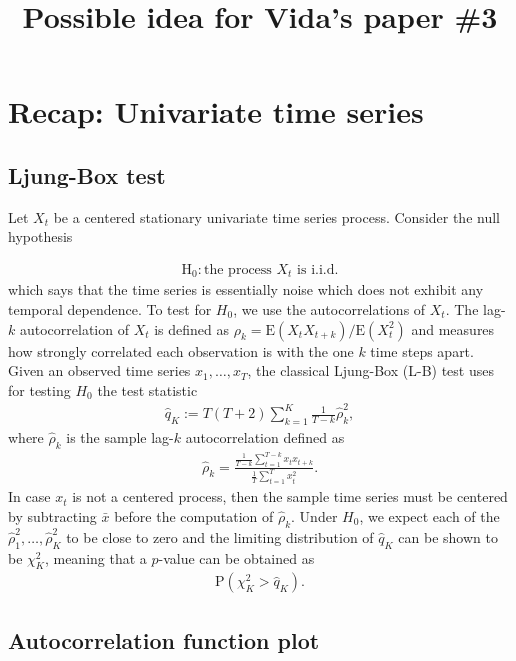 \documentclass{article}
\title{Possible idea for Vida's paper \#3}
\date{}
\begin{document}
\maketitle

\section{Recap: Univariate time series}

\subsection{Ljung-Box test}

Let $X_t$ be a centered stationary univariate time series process. Consider the null hypothesis

\begin{align*}
    \mathrm{H_{0}}: \mbox{the process $X_t$ is i.i.d.} 
\end{align*}
which says that the time series is essentially noise which does not exhibit any temporal dependence. To test for $H_{0}$, we use the autocorrelations of $X_t$. The lag-$k$ autocorrelation of $X_t$ is defined as $\rho_k = \mathrm{E}(X_t X_{t + k})/\mathrm{E}(X_t^2)$ and measures how strongly correlated each observation is with the one $k$ time steps apart. Given an observed time series $x_1, \ldots, x_T$, the classical Ljung-Box (L-B) test uses for testing $H_0$ the test statistic
\begin{align*}
    \hat{q}_K := T(T + 2) \sum_{k = 1}^K \frac{1}{T - k} \hat{\rho}_k^2,
\end{align*}
where $\hat{\rho}_k$ is the sample lag-$k$ autocorrelation defined as
\begin{align*}
    \hat{\rho}_k = \frac{\frac{1}{T - k} \sum_{t = 1}^{T - k} x_{t} x_{t + k} }{\frac{1}{T} \sum_{t = 1}^{T} x_{t}^2}.
\end{align*}
In case $x_t$ is not a centered process, then the sample time series must be centered by subtracting $\bar{x}$ before the computation of $\hat{\rho}_k$. Under $H_{0}$, we expect each of the $\hat{\rho}_1^2, \ldots, \hat{\rho}_K^2$ to be close to zero and the limiting distribution of $\hat{q}_K$ can be shown to be $\chi^2_K$, meaning that a $p$-value can be obtained as
\begin{align*}
    \mathrm{P}(\chi^2_K > \hat{q}_K).
\end{align*}

\subsection{Autocorrelation function plot}
\end{document}
